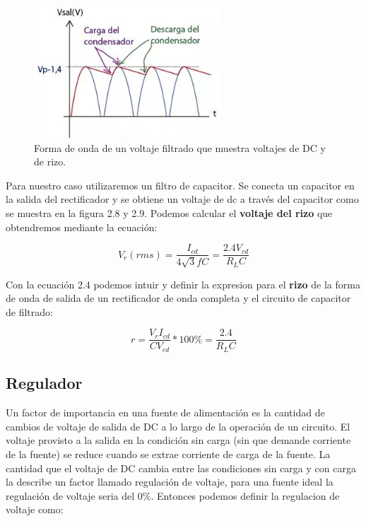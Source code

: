 \begin{figure}[H]
\centering
\includegraphics[width=7cm]{capitulo3/figs/filtro.png}
\caption{ Forma de onda de un voltaje filtrado que muestra voltajes de DC y de rizo.}
\end{figure}

Para nuestro caso utilizaremos un filtro de capacitor. Se conecta un capacitor en la salida del rectificador y se obtiene un voltaje de dc a través del capacitor como se muestra en la figura 2.8 y 2.9. Podemos calcular el \textbf{voltaje del rizo} que obtendremos mediante la ecuación:

\begin{equation}
V_{r}(rms)=\dfrac{I_{cd}}{4\sqrt{3}fC}=\dfrac{2.4V_{cd}}{R_{L}C}
\end{equation}

Con la ecuación 2.4 podemos intuir y definir la expresion para el \textbf{rizo} de la forma de onda de salida de un rectificador de onda completa y el circuito de capacitor de filtrado:

\begin{equation}
r=\dfrac{V_{r}I_{cd}}{CV_{cd}}*100\%=\dfrac{2.4}{R_{L}C}
\end{equation}

\subsection{Regulador}

Un factor de importancia en una fuente de alimentación es la cantidad de cambios de voltaje de salida de DC a lo largo de la operación de un circuito. El voltaje provisto a la salida en la condición sin carga (sin que demande corriente de la fuente) se reduce cuando se extrae corriente de carga de la fuente. La cantidad que el voltaje de DC cambia entre las condiciones sin carga y con carga la describe un factor llamado regulación de voltaje, para una fuente ideal la regulación de voltaje seria del 0\%. Entonces podemos definir la regulacion de voltaje como:
 

